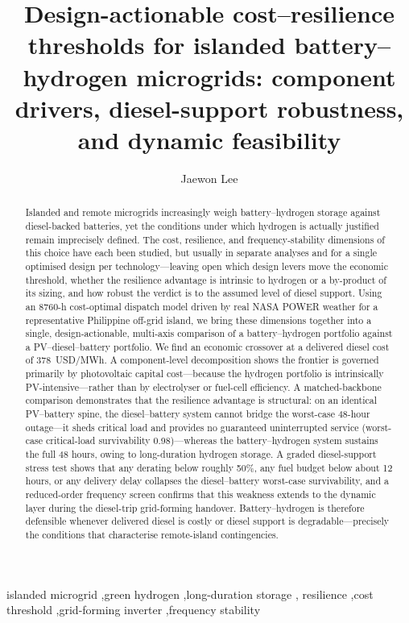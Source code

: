 \documentclass[preprint,12pt]{elsarticle}
\begin{document}
\begin{frontmatter}

\title{Design-actionable cost--resilience thresholds for islanded
battery--hydrogen microgrids: component drivers, diesel-support robustness,
and dynamic feasibility}

\author{Jaewon Lee}
\address{National Institute of Green Technology, Republic of Korea}

\begin{abstract}
Islanded and remote microgrids increasingly weigh battery--hydrogen storage
against diesel-backed batteries, yet the conditions under which hydrogen is
actually justified remain imprecisely defined. The cost, resilience, and
frequency-stability dimensions of this choice have each been studied, but
usually in separate analyses and for a single optimised design per
technology---leaving open which design levers move the economic threshold,
whether the resilience advantage is intrinsic to hydrogen or a by-product of its
sizing, and how robust the verdict is to the assumed level of diesel support.
Using an 8760-h cost-optimal dispatch model driven by real NASA POWER weather
for a representative Philippine off-grid island, we bring these dimensions
together into a single, design-actionable, multi-axis comparison of a
battery--hydrogen portfolio against a PV--diesel--battery portfolio. We find an
economic crossover at a delivered diesel cost of 378~USD/MWh. A component-level
decomposition shows the frontier is governed primarily by photovoltaic capital
cost---because the hydrogen portfolio is intrinsically PV-intensive---rather than
by electrolyser or fuel-cell efficiency. A matched-backbone comparison
demonstrates that the resilience advantage is structural: on an identical
PV--battery spine, the diesel--battery system cannot bridge the worst-case
48-hour outage---it sheds critical load and provides no guaranteed uninterrupted
service (worst-case critical-load survivability 0.98)---whereas the
battery--hydrogen system sustains the full 48 hours, owing to long-duration
hydrogen storage. A graded diesel-support stress
test shows that any derating below roughly 50\%, any fuel budget below about 12
hours, or any delivery delay collapses the diesel--battery worst-case
survivability, and a reduced-order frequency screen confirms that this weakness
extends to the dynamic layer during the diesel-trip grid-forming handover.
Battery--hydrogen is therefore defensible whenever delivered diesel is costly or
diesel support is degradable---precisely the conditions that characterise
remote-island contingencies.
\end{abstract}

\begin{keyword}
islanded microgrid \sep green hydrogen \sep long-duration storage \sep
resilience \sep cost threshold \sep grid-forming inverter \sep frequency stability
\end{keyword}

\end{frontmatter}
\end{document}
